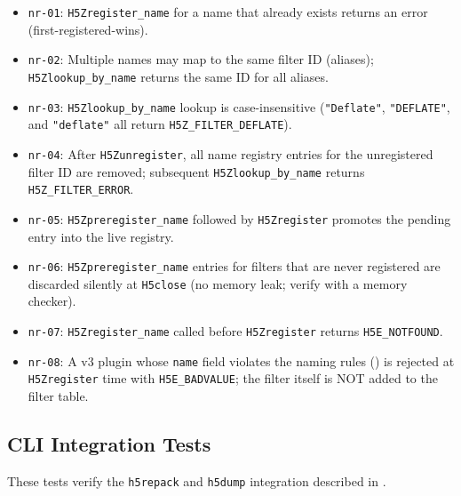 \documentclass[../HDF5_RFC.tex]{subfiles}
\begin{document}
\begin{itemize}
\item \texttt{nr-01}: \texttt{H5Zregister\_name} for a name that already exists returns
  an error (first-registered-wins).
\item \texttt{nr-02}: Multiple names may map to the same filter ID (aliases);
  \texttt{H5Zlookup\_by\_name} returns the same ID for all aliases.
\item \texttt{nr-03}: \texttt{H5Zlookup\_by\_name} lookup is case-insensitive
  (\texttt{"Deflate"}, \texttt{"DEFLATE"}, and \texttt{"deflate"} all return
  \texttt{H5Z\_FILTER\_DEFLATE}).
\item \texttt{nr-04}: After \texttt{H5Zunregister}, all name registry entries for the
  unregistered filter ID are removed; subsequent \texttt{H5Zlookup\_by\_name} returns
  \texttt{H5Z\_FILTER\_ERROR}.
\item \texttt{nr-05}: \texttt{H5Zpreregister\_name} followed by \texttt{H5Zregister} promotes
  the pending entry into the live registry.
\item \texttt{nr-06}: \texttt{H5Zpreregister\_name} entries for filters that are never
  registered are discarded silently at \texttt{H5close} (no memory leak; verify
  with a memory checker).
\item \texttt{nr-07}: \texttt{H5Zregister\_name} called before \texttt{H5Zregister} returns
  \texttt{H5E\_NOTFOUND}.
\item \texttt{nr-08}: A v3 plugin whose \texttt{name} field violates the naming rules
  () is rejected at \texttt{H5Zregister} time with
  \texttt{H5E\_BADVALUE}; the filter itself is NOT added to the filter table.
\end{itemize}


\subsection{CLI Integration Tests}
\label{sec:test-cli}

These tests verify the \texttt{h5repack} and \texttt{h5dump} integration described
in .
\end{document}
